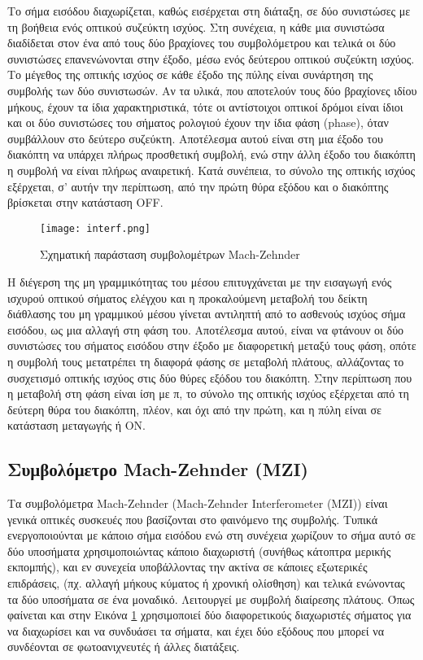 Το σήμα εισόδου διαχωρίζεται, καθώς εισέρχεται στη διάταξη, σε δύο
συνιστώσες με τη βοήθεια ενός οπτικού συζεύκτη ισχύος. Στη συνέχεια, η
κάθε μια συνιστώσα διαδίδεται στον ένα από τους δύο βραχίονες του
συμβολόμετρου και τελικά οι δύο συνιστώσες επανενώνονται στην έξοδο,
μέσω ενός δεύτερου οπτικού συζεύκτη ισχύος. Το μέγεθος της οπτικής
ισχύος σε κάθε έξοδο της πύλης είναι συνάρτηση της συμβολής των δύο
συνιστωσών. Αν τα υλικά, που αποτελούν τους δύο βραχίονες ιδίου
μήκους, έχουν τα ίδια χαρακτηριστικά, τότε οι αντίστοιχοι οπτικοί
δρόμοι είναι ίδιοι και οι δύο συνιστώσες του σήματος ρολογιού έχουν
την ίδια φάση (phase), όταν συμβάλλουν στο δεύτερο
συζεύκτη. Αποτέλεσμα αυτού είναι στη μια έξοδο του διακόπτη να υπάρχει
πλήρως προσθετική συμβολή, ενώ στην άλλη έξοδο του διακόπτη η συμβολή
να είναι πλήρως αναιρετική. Κατά συνέπεια, το σύνολο της οπτικής
ισχύος εξέρχεται, σ’ αυτήν την περίπτωση, από την πρώτη θύρα εξόδου
και ο διακόπτης βρίσκεται στην κατάσταση OFF.

\begin{figure}[H]
  \centering
  \texttt{[image: interf.png]}
  \caption{Σχηματική παράσταση συμβολομέτρων Mach-Zehnder}
  \label{fig:mzi}
\end{figure}


Η διέγερση της μη γραμμικότητας του μέσου επιτυγχάνεται με την
εισαγωγή ενός ισχυρού οπτικού σήματος ελέγχου και η προκαλούμενη
μεταβολή του δείκτη διάθλασης του μη γραμμικού μέσου γίνεται αντιληπτή
από το ασθενούς ισχύος σήμα εισόδου, ως μια αλλαγή στη φάση
του. Αποτέλεσμα αυτού, είναι να φτάνουν οι δύο συνιστώσες του σήματος
εισόδου στην έξοδο με διαφορετική μεταξύ τους φάση, οπότε η συμβολή
τους μετατρέπει τη διαφορά φάσης σε μεταβολή πλάτους, αλλάζοντας το
συσχετισμό οπτικής ισχύος στις δύο θύρες εξόδου του διακόπτη. Στην
περίπτωση που η μεταβολή στη φάση είναι ίση με π, το σύνολο της
οπτικής ισχύος εξέρχεται από τη δεύτερη θύρα του διακόπτη, πλέον, και
όχι από την πρώτη, και η πύλη είναι σε κατάσταση μεταγωγής ή ON.

\subsection{Συμβολόμετρο Mach-Zehnder (MZI)}


Tα συμβολόμετρα Mach-Zehnder (Mach-Zehnder Interferometer (ΜΖΙ)) είναι
γενικά οπτικές συσκευές που βασίζονται στο φαινόμενο της
συμβολής. Τυπικά ενεργοποιούνται με κάποιο σήμα εισόδου ενώ στη
συνέχεια χωρίζουν το σήμα αυτό σε δύο υποσήματα χρησιμοποιώντας κάποιο
διαχωριστή (συνήθως κάτοπτρα μερικής εκπομπής), και εν συνεχεία
υποβάλλοντας την ακτίνα σε κάποιες εξωτερικές επιδράσεις, (πχ. αλλαγή
μήκους κύματος ή χρονική ολίσθηση) και τελικά ενώνοντας τα δύο
υποσήματα σε ένα μοναδικό. Λειτουργεί με συμβολή διαίρεσης πλάτους.
Όπως φαίνεται και στην Εικόνα \ref{fig:mzi}  χρησιμοποιεί δύο διαφορετικούς
διαχωριστές σήματος για να διαχωρίσει και να συνδυάσει τα σήματα, και
έχει δύο εξόδους που μπορεί να συνδέονται σε φωτοανιχνευτές ή άλλες
διατάξεις.

